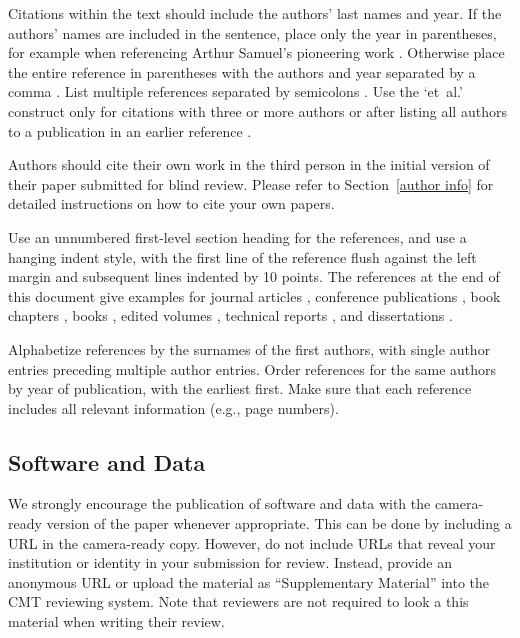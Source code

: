 \documentclass{article}
\begin{document}
Citations within the text should include the authors' last names and
year. If the authors' names are included in the sentence, place only
the year in parentheses, for example when referencing Arthur Samuel's
pioneering work . Otherwise place the entire
reference in parentheses with the authors and year separated by a
comma \cite{Bendall:2011bm}. List multiple references separated by
semicolons \cite{Bendall:2011bm, Crammer:2002uy, Bendall:2011bm}. Use the `et~al.'
construct only for citations with three or more authors or after
listing all authors to a publication in an earlier reference \cite{Bendall:2011bm}.

Authors should cite their own work in the third person
in the initial version of their paper submitted for blind review.
Please refer to Section~\ref{author info} for detailed instructions on how to
cite your own papers.

Use an unnumbered first-level section heading for the references, and 
use a hanging indent style, with the first line of the reference flush
against the left margin and subsequent lines indented by 10 points. 
The references at the end of this document give examples for journal
articles \cite{Bendall:2011bm}, conference publications \cite{Bendall:2011bm}, book chapters \cite{Bendall:2011bm}, books \cite{Bendall:2011bm}, edited volumes \cite{Bendall:2011bm}, 
technical reports \cite{Crammer:2002uy}, and dissertations \cite{Bendall:2011bm}. 

Alphabetize references by the surnames of the first authors, with
single author entries preceding multiple author entries. Order
references for the same authors by year of publication, with the
earliest first. Make sure that each reference includes all relevant
information (e.g., page numbers).

\subsection{Software and Data}

We strongly encourage the publication of software and data with the
camera-ready version of the paper whenever appropriate.  This can be
done by including a URL in the camera-ready copy.  However, do not
include URLs that reveal your institution or identity in your
submission for review.  Instead, provide an anonymous URL or upload
the material as ``Supplementary Material'' into the CMT reviewing
system.  Note that reviewers are not required to look a this material
when writing their review.
\end{document}
